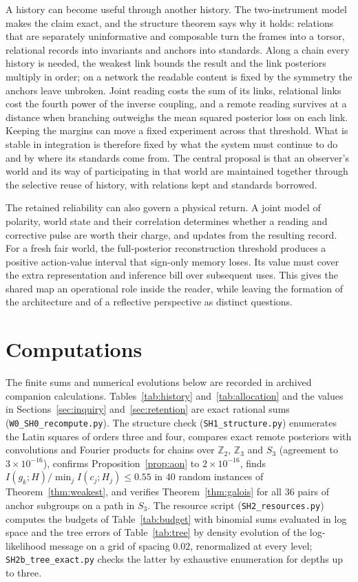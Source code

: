 \documentclass[11pt,a4paper]{article}
\begin{document}
A history can become useful through another history. The two-instrument model makes the claim exact, and the structure theorem says why it holds: relations that are separately uninformative and composable turn the frames into a torsor, relational records into invariants and anchors into standards. Along a chain every history is needed, the weakest link bounds the result and the link posteriors multiply in order; on a network the readable content is fixed by the symmetry the anchors leave unbroken. Joint reading costs the sum of its links, relational links cost the fourth power of the inverse coupling, and a remote reading survives at a distance when branching outweighs the mean squared posterior loss on each link. Keeping the margins can move a fixed experiment across that threshold. What is stable in integration is therefore fixed by what the system must continue to do and by where its standards come from. The central proposal is that an observer's world and its way of participating in that world are maintained together through the selective reuse of history, with relations kept and standards borrowed.

The retained reliability can also govern a physical return. A joint model of polarity, world state and their correlation determines whether a reading and corrective pulse are worth their charge, and updates from the resulting record. For a fresh fair world, the full-posterior reconstruction threshold produces a positive action-value interval that sign-only memory loses. Its value must cover the extra representation and inference bill over subsequent uses. This gives the shared map an operational role inside the reader, while leaving the formation of the architecture and of a reflective perspective as distinct questions.

\appendix
\section{Computations}\label{app:computations}

The finite sums and numerical evolutions below are recorded in archived companion calculations. Tables~\ref{tab:history} and~\ref{tab:allocation} and the values in Sections~\ref{sec:inquiry} and~\ref{sec:retention} are exact rational sums (\texttt{W0\_SH0\_recompute.py}). The structure check (\texttt{SH1\_structure.py}) enumerates the Latin squares of orders three and four, compares exact remote posteriors with convolutions and Fourier products for chains over $\mathbb Z_2$, $\mathbb Z_3$ and $S_3$ (agreement to $3\times10^{-16}$), confirms Proposition~\ref{prop:aon} to $2\times10^{-16}$, finds $I(g_k;H)/\min_jI(c_j;H_j)\le0.55$ in $40$ random instances of Theorem~\ref{thm:weakest}, and verifies Theorem~\ref{thm:galois} for all $36$ pairs of anchor subgroups on a path in $S_3$. The resource script (\texttt{SH2\_resources.py}) computes the budgets of Table~\ref{tab:budget} with binomial sums evaluated in log space and the tree errors of Table~\ref{tab:tree} by density evolution of the log-likelihood message on a grid of spacing $0.02$, renormalized at every level; \texttt{SH2b\_tree\_exact.py} checks the latter by exhaustive enumeration for depths up to three.
\end{document}
